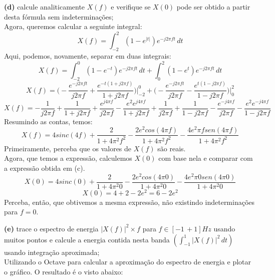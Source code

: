 \documentclass[10pt, a4paper]{article}
\begin{document}
\vspace{\baselineskip}

{\textbf{(d)}} calcule analiticamente $X(f)$ e verifique se $X(0)$ pode ser obtido a partir desta fórmula sem indeterminações;\\
Agora, queremos calcular a seguinte integral:
\[X(f) = \int_{-2}^{2} (1 - e^{|t|})e^{-j2\pi ft}\,dt\]
Aqui, podemos, novamente, separar em duas integrais:
\[X(f) = \int_{-2}^{0} (1 - e^{-t})e^{-j2\pi ft}\,dt + \int_{0}^{2} (1 - e^{t})e^{-j2\pi ft}\,dt\]
\[X(f) = \biggl(-\frac{e^{-j2\pi ft}}{j2\pi f} + \frac{e^{-t(1 + j2\pi f)}}{1 + j2\pi f}\biggr)\bigg|_{-2}^{0} + 
\biggl(-\frac{e^{-j2\pi ft}}{j2\pi f} - \frac{e^{t(1 - j2\pi f)}}{1 - j2\pi f}\biggr)\bigg|_{0}^{2}\]
\[X(f) = -\frac{1}{j2\pi f} + \frac{1}{1 + j2\pi f} + \frac{e^{j4\pi f}}{j2\pi f} - \frac{e^2e^{j4\pi f}}{1 + j2\pi f} +
\frac{1}{j2\pi f} + \frac{1}{1 - j2\pi f} - \frac{e^{-j4\pi f}}{j2\pi f} - \frac{e^2e^{-j4\pi f}}{1 - j2\pi f}\]
Resumindo as contas, temos:
\[X(f) = 4sinc(4f) + \frac{2}{1 + 4\pi^2f^2} - \frac{2e^2cos(4\pi f)}{1 + 4\pi^2 f^2} - \frac{4e^2\pi f sen(4\pi f)}{1 + 4\pi^2 f^2}\]
Primeiramente, perceba que os valores de $X(f)$ são reais.\\
Agora, que temos a expressão, calculemos $X(0)$ com base nela e comparar com a expressão obtida em (c).
\[X(0) = 4sinc(0) + \frac{2}{1 + 4\pi^2 0} - \frac{2e^2cos(4\pi 0)}{1 + 4\pi^2 0} - \frac{4e^2\pi 0 sen(4\pi 0)}{1 + 4\pi^2 0}\]
\[X(0) = 4 + 2 - 2e^2 = 6 - 2e^2\]
Perceba, então, que obtivemos a mesma expressão, não existindo indeterminações para $f = 0$.

\vspace{\baselineskip}

{\textbf{(e)}} trace o espectro de energia $|X(f)|^{2} \times f$ para $f \in [-1\,+ 1]Hz$ usando muitos pontos e calcule a energia contida nesta banda $(\int_{-1}^{1} |X(f)|^{2}\,dt)$ usando integração aproximada;\\
Utilizando o Octave para calcular a aproximação do espectro de energia e plotar o gráfico. O resultado é o visto abaixo:
\end{document}
